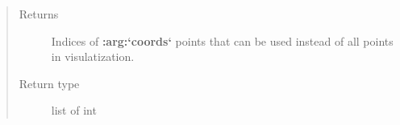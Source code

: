 \documentclass[a4paper,10pt,english]{sphinxmanual}
\begin{document}
\begin{fulllineitems}
\begin{fulllineitems}
\begin{quote}
\begin{description}
\item[{Returns}] \leavevmode
Indices of {\color{red}\bfseries{}:arg:{}`coords{}`} points that can be used instead of all points in visulatization.

\item[{Return type}] \leavevmode
list of int

\end{description}\end{quote}

\end{fulllineitems}


\begin{fulllineitems}
\label{aqueduct.geom.traces:aqueduct.geom.traces.LinearizeRecursive.__call__}
\end{fulllineitems}


\end{fulllineitems}

\end{document}
